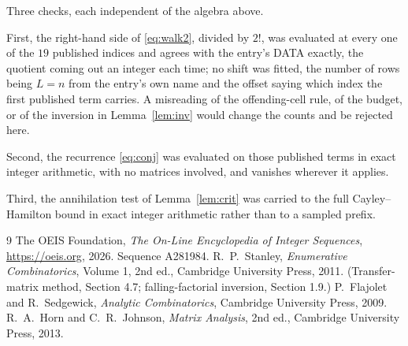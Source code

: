 \documentclass[11pt,a4paper]{article}
\theoremstyle{plain}
\theoremstyle{definition}
\begin{document}
Three checks, each independent of the algebra above.

First, the right-hand side of \eqref{eq:walk2}, divided by $2!$, was evaluated at every
one of the $19$ published indices and agrees with the entry's DATA exactly, the quotient
coming out an integer each time; no shift was fitted, the number of rows being
$L=n$ from the entry's own name and the offset saying which index the first published
term carries. A misreading of the offending-cell rule, of the budget, or of the inversion in
Lemma~\ref{lem:inv} would change the counts and be rejected here.

Second, the recurrence \eqref{eq:conj} was evaluated on those published terms in exact
integer arithmetic, with no matrices involved, and vanishes wherever it applies.

Third, the annihilation test of Lemma~\ref{lem:crit} was carried to the full
Cayley--Hamilton bound in exact integer arithmetic rather than to a sampled prefix.

\begin{thebibliography}{9}
 The OEIS Foundation, \emph{The On-Line Encyclopedia of Integer
Sequences}, \url{https://oeis.org}, 2026. Sequence A281984.
 R.~P.~Stanley, \emph{Enumerative Combinatorics}, Volume 1, 2nd ed.,
Cambridge University Press, 2011. (Transfer-matrix method, Section 4.7; falling-factorial
inversion, Section 1.9.)
 P.~Flajolet and R.~Sedgewick, \emph{Analytic Combinatorics}, Cambridge
University Press, 2009.
 R.~A.~Horn and C.~R.~Johnson, \emph{Matrix Analysis}, 2nd ed., Cambridge
University Press, 2013.
\end{thebibliography}
\end{document}
